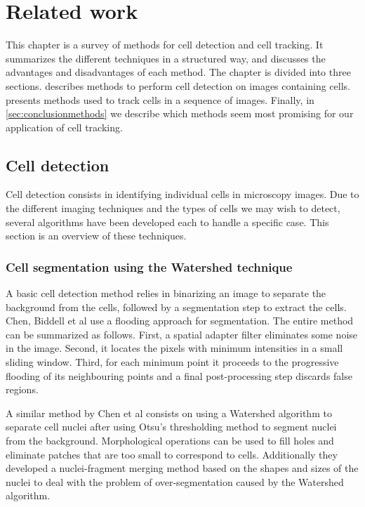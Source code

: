 \chapter{Related work \statusfirstdraft}
\label{chap:relatedwork}
This chapter is a survey of methods for cell detection and cell tracking. It summarizes the different techniques in a structured way, and discusses the advantages and disadvantages of each method. The chapter is divided into three sections.  describes methods to perform cell detection on images containing cells.  presents methods used to track cells in a sequence of images. Finally, in \cref{sec:conclusionmethods} we describe which methods seem most promising for our application of cell tracking. 
	

\section{Cell detection \statusfirstdraft}
\label{sec:detection}
\label{sec:relatedworkdetection}

Cell detection consists in identifying individual cells in microscopy images. Due to the different imaging techniques and the types of cells we may wish to detect, several algorithms have been developed each to handle a specific case. This section is an overview of these techniques.

\subsection{Cell segmentation using the Watershed technique \statusfirstdraft}

A basic cell detection method relies in binarizing an image to separate the background from the cells, followed by a segmentation step to extract the cells. Chen, Biddell et al \cite{chen99} use a flooding approach for segmentation. The entire method can be summarized as follows. First, a spatial adapter filter eliminates some noise in the image. Second, it locates the pixels with minimum intensities in a small sliding window. Third, for each minimum point it proceeds to the progressive flooding of its neighbouring points and a final post-processing step discards false regions.

A similar method by Chen et al \cite{chen06} consists on using a Watershed algorithm \cite{vincent93} to separate cell nuclei after using Otsu's thresholding method to segment nuclei from the background. Morphological operations \cite{serra83} can be used to fill holes and eliminate patches that are too small to correspond to cells. Additionally they developed a nuclei-fragment merging method based on the shapes and sizes of the nuclei to deal with the problem of over-segmentation caused by the Watershed algorithm.

